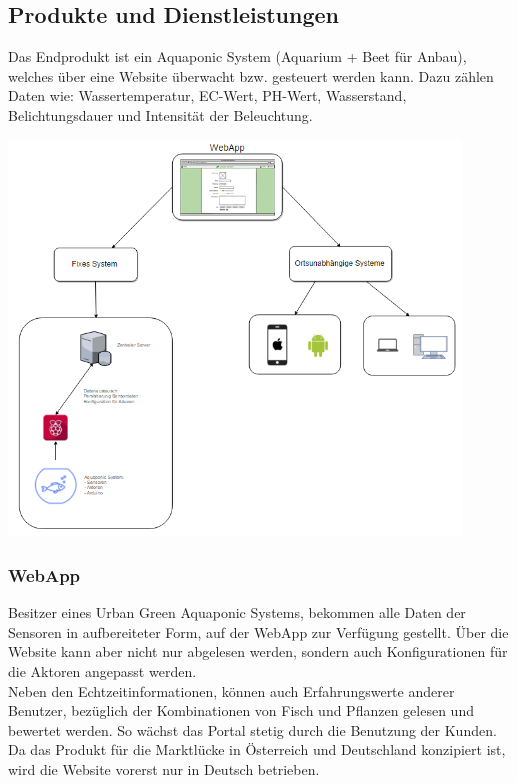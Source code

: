 \documentclass[11pt]{article}
\begin{document}
\subsection{Produkte und Dienstleistungen}
Das Endprodukt ist ein Aquaponic System (Aquarium + Beet f\"ur Anbau), welches \"uber eine Website \"uberwacht bzw. gesteuert werden kann. Dazu z\"ahlen Daten wie: Wassertemperatur, EC-Wert, PH-Wert, Wasserstand, Belichtungsdauer und Intensit\"at der Beleuchtung.
\begin{center}
	\includegraphics[width=12cm]{produkte}
\end{center}
\subsubsection{WebApp}
Besitzer eines Urban Green Aquaponic Systems, bekommen alle Daten der Sensoren in aufbereiteter Form, auf der WebApp zur Verf\"ugung gestellt. \"Uber die Website kann aber nicht nur abgelesen werden, sondern auch Konfigurationen f\"ur die Aktoren angepasst werden. \\
Neben den Echtzeitinformationen, k\"onnen auch Erfahrungswerte anderer Benutzer, bez\"uglich der Kombinationen von Fisch und Pflanzen gelesen und bewertet werden. So w\"achst das Portal stetig durch die Benutzung der Kunden. \\
Da das Produkt f\"ur die Marktl\"ucke in \"Osterreich und Deutschland konzipiert ist, wird die Website vorerst nur in Deutsch betrieben.
\end{document}
